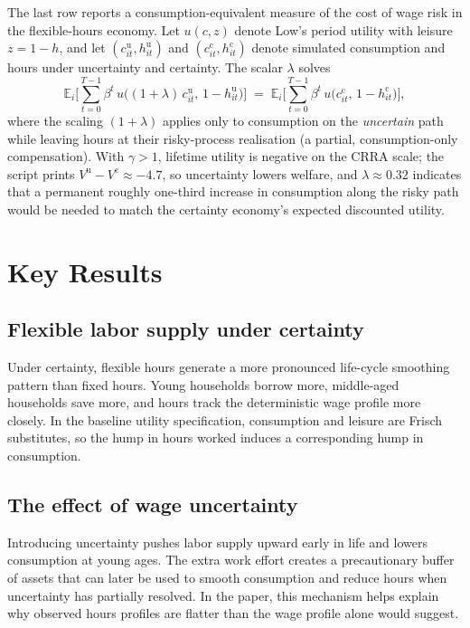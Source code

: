 \documentclass[titlepage, headings=optiontotocandhead]{econark} %
\begin{document}
The last row reports a consumption-equivalent measure of the cost of
wage risk in the flexible-hours economy.  Let $u(c,z)$ denote Low's
period utility with leisure $z=1-h$, and let $(c_{it}^{\mathrm u},
h_{it}^{\mathrm u})$ and $(c_{it}^{\mathrm c}, h_{it}^{\mathrm c})$
denote simulated consumption and hours under uncertainty and certainty.
The scalar $\lambda$ solves
\[
  \mathbb{E}_i\Big[\sum_{t=0}^{T-1} \beta^t\,
  u\big((1+\lambda)\,c_{it}^{\mathrm u},\,1-h_{it}^{\mathrm u}\big)\Big]
  \;=\;
  \mathbb{E}_i\Big[\sum_{t=0}^{T-1} \beta^t\,
  u\big(c_{it}^{\mathrm c},\,1-h_{it}^{\mathrm c}\big)\Big],
\]
where the scaling $(1+\lambda)$ applies only to
consumption on the \emph{uncertain} path while leaving hours at their
risky-process realisation (a partial, consumption-only compensation).
With $\gamma>1$, lifetime utility is negative on the CRRA scale; the
script prints $V^{\mathrm u}-V^{\mathrm c}\approx -4.7$, so uncertainty
lowers welfare, and $\lambda\approx 0.32$ indicates that a permanent
roughly one-third increase in consumption along the risky path would be
needed to match the certainty economy's expected discounted utility.

\section{Key Results}

\subsection{Flexible labor supply under certainty}
Under certainty, flexible hours generate a more pronounced life-cycle smoothing pattern than
fixed hours. Young households borrow more, middle-aged households save more, and hours
track the deterministic wage profile more closely. In the baseline utility specification,
consumption and leisure are Frisch substitutes, so the hump in hours worked induces a
corresponding hump in consumption.

\subsection{The effect of wage uncertainty}
Introducing uncertainty pushes labor supply upward early in life and lowers consumption at
young ages. The extra work effort creates a precautionary buffer of assets that can later be
used to smooth consumption and reduce hours when uncertainty has partially resolved. In the
paper, this mechanism helps explain why observed hours profiles are flatter than the wage
profile alone would suggest.
\end{document}
